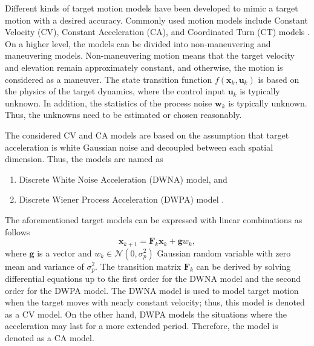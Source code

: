 \documentclass[english, 12pt, a4paper, elec, utf8, a-1b, online]{aaltothesis}
\renewcommand{\vec}[1]{\mathbf{#1}}
\newcommand{\x}{\vec{x}_k}
\newcommand{\cinput}{\vec{u}_k}
\newcommand{\pnoise}{\vec{w}_k}
\newcommand{\normal}[2]{\mathcal{N}\left(#1, #2 \right)}
\begin{document}
Different kinds of target motion models have been developed to mimic a target motion with a desired accuracy. 
Commonly used motion models include Constant Velocity (CV), Constant Acceleration (CA), and Coordinated Turn (CT) models \cite{RongLi2003}.
On a higher level, the models can be divided into non-maneuvering and maneuvering models. 
Non-maneuvering motion means that the target velocity and elevation remain approximately constant, and otherwise, the motion is considered as a maneuver.
The state transition function $f(\x, \cinput)$ is based on the physics of the target dynamics, where the control input $\cinput$ is typically unknown.
In addition, the statistics of the process noise $\pnoise$ is typically unknown.
Thus, the unknowns need to be estimated or chosen reasonably.

The considered CV and CA models are based on the assumption that target acceleration is white Gaussian noise and decoupled between each spatial dimension.
Thus, the models are named as
\begin{enumerate}
    \item Discrete White Noise Acceleration (DWNA) model, and
    \item Discrete Wiener Process Acceleration (DWPA) model \cite{BarShalom2001}.
\end{enumerate}
The aforementioned target models can be expressed with linear combinations as follows
\begin{equation}
    \vec{x}_{k+1} = \mathbf{F}_k \vec{x}_k + \vec{g} w_k,
\end{equation}
where $\vec{g}$ is a vector and $w_k \in \normal{0}{\sigma_p^2}$ Gaussian random variable with zero mean and variance of $\sigma_p^2$.
The transition matrix $\mathbf{F}_k$ can be derived by solving differential equations up to the first order for the DWNA model and the second order for the DWPA model.
The DWNA model is used to model target motion when the target moves with nearly constant velocity; thus, this model is denoted as a CV model.
On the other hand, DWPA models the situations where the acceleration may last for a more extended period. 
Therefore, the model is denoted as a CA model.
\end{document}
